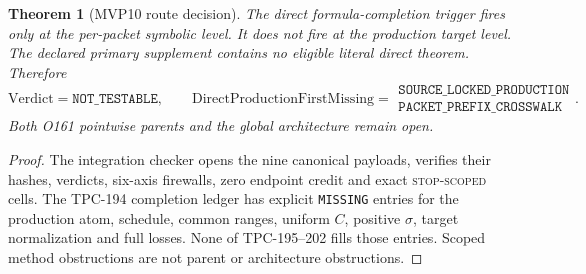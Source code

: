 \documentclass[11pt]{article}
\newtheorem{theorem}{Theorem}
\begin{document}
\begin{theorem}[MVP10 route decision]
The direct formula-completion trigger fires only at the per-packet symbolic
level.  It does not fire at the production target level.  The declared
primary supplement contains no eligible literal direct theorem.  Therefore
\[
\mathrm{Verdict}=\texttt{NOT\_TESTABLE},
\qquad
\mathrm{DirectProductionFirstMissing}
=\substack{\texttt{SOURCE\_LOCKED\_PRODUCTION}\\
           \texttt{PACKET\_PREFIX\_CROSSWALK}}.
\]
Both O161 pointwise parents and the global architecture remain open.
\end{theorem}
\begin{proof}
The integration checker opens the nine canonical payloads, verifies their
hashes, verdicts, six-axis firewalls, zero endpoint credit and exact
\textsc{stop-scoped} cells.  The TPC-194 completion ledger has explicit
\texttt{MISSING} entries for the production atom, schedule, common ranges,
uniform \(C\), positive \(\sigma\), target normalization and full losses.
None of TPC-195--202 fills those entries.  Scoped method obstructions are
not parent or architecture obstructions.
\end{proof}
\end{document}
